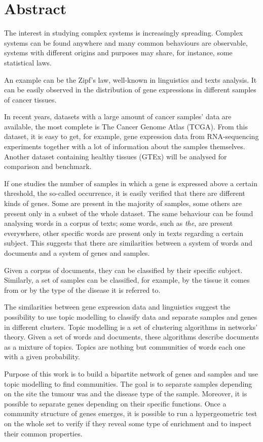 \chapter*{Abstract}
The interest in studying complex systems is increasingly spreading.
Complex systems can be found anywhere and many common behaviours are
observable, systems with different origins and purposes may share, for
instance, some statistical laws.

An example can be the Zipf's law, well-known in linguistics and texts
analysis. It can be easily observed in the distribution of gene expressions
in different samples of cancer tissues.

In recent years, datasets with a large amount of cancer samples' data are
available, the most complete is The Cancer Genome Atlas (TCGA). From
this dataset, it is easy to get, for example, gene expression data from
RNA-sequencing experiments together with a lot of information about the
samples themselves. Another dataset containing healthy tissues (GTEx) will be analysed for comparison and benchmark.

If one studies the number of samples in which a gene is expressed above
a certain threshold, the so-called occurrence, it is easily verified
that there are different kinds of genes. Some are present in the
majority of samples, some others are present only in a subset of the
whole dataset. The same behaviour can be found analysing words in
a corpus of texts; some words, such as \emph{the}, are present everywhere,
other specific words are present only in texts regarding a certain
subject. This suggests that there are similarities between a system of
words and documents and a system of genes and samples.

Given a corpus of documents, they can be classified by their specific
subject. Similarly, a set of samples can be classified, for
example, by the tissue it comes from or by the type of the disease it is
referred to.

The similarities between gene expression data and linguistics suggest
the possibility to use topic modelling to classify data and separate
samples and genes in different clusters. Topic modelling is a set of
clustering algorithms in networks' theory. Given a set of words and
documents, these algorithms describe documents as a mixture of topics. Topics are
nothing but communities of words each one with a given probability.

Purpose of this work is to build a bipartite network of genes and
samples and use topic modelling to find communities. The goal is to
separate samples depending on the site the tumour was and the disease
type of the sample. Moreover, it is possible to separate genes depending
on their specific functions. Once a community structure of genes
emerges, it is possible to run a hypergeometric test on the whole set to verify if they reveal some type of enrichment and to inspect
their common properties.

